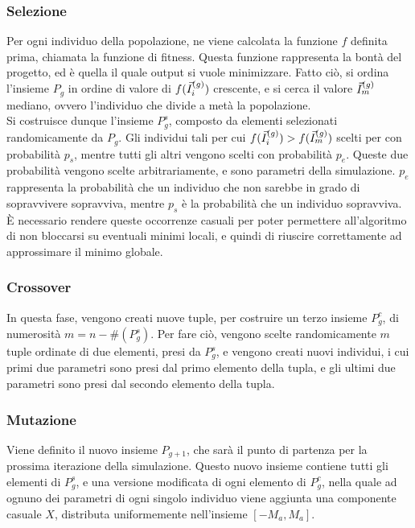 \documentclass[fleqn,10pt]{SelfArx} %
\begin{document}
\subsubsection{Selezione}
Per ogni individuo della popolazione, ne viene calcolata la funzione \(f\) definita prima, chiamata la funzione di fitness.
Questa funzione rappresenta la bontà del progetto, ed è quella il quale output si vuole minimizzare.
Fatto ciò, si ordina l'insieme \(P_g\) in ordine di valore di \(f(\vec{I}^{(g)}_i)\) crescente, e si cerca il valore \(\vec{I}^{(g)}_m\) mediano, ovvero l'individuo che divide a metà la popolazione. \\
Si costruisce dunque l'insieme \(P^s_g\), composto da elementi selezionati randomicamente da \(P_g\).
Gli individui tali per cui \(f(\vec{I}^{(g)}_i) > f(\vec{I}^{(g)}_m)\) scelti per con probabilità \(p_s\), mentre tutti gli altri vengono scelti con probabilità \(p_e\).
Queste due probabilità vengono scelte arbitrariamente, e sono parametri della simulazione. 
\(p_e\) rappresenta la probabilità che un individuo che non sarebbe in grado di sopravvivere sopravviva, mentre \(p_s\) è la probabilità che un individuo sopravviva.
È necessario rendere queste occorrenze casuali per poter permettere all'algoritmo di non bloccarsi su eventuali minimi locali, e quindi di riuscire correttamente ad approssimare il minimo globale.

\subsubsection{Crossover}
In questa fase, vengono creati nuove tuple, per costruire un terzo insieme \(P^c_g\), di numerosità \(m = n - \#(P^s_g)\).
Per fare ciò, vengono scelte randomicamente \(m\) tuple ordinate di due elementi, presi da \(P^s_g\), e vengono creati nuovi individui, i cui primi due parametri sono presi dal primo elemento della tupla, e gli ultimi due parametri sono presi dal secondo elemento della tupla.

\subsubsection{Mutazione}
Viene definito il nuovo insieme \(P_{g + 1}\), che sarà il punto di partenza per la prossima iterazione della simulazione.
Questo nuovo insieme contiene tutti gli elementi di \(P^s_g\), e una versione modificata di ogni elemento di \(P^c_g\), nella quale ad ognuno dei parametri di ogni singolo individuo viene aggiunta una componente casuale \(X\), distributa uniformemente nell'insieme \([-M_a, M_a]\).
\end{document}
